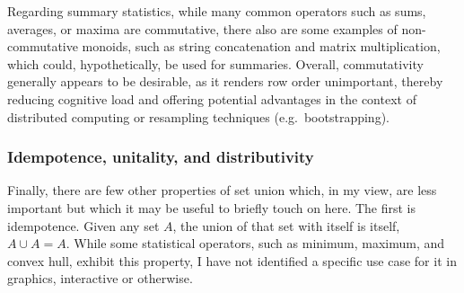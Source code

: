 \documentclass[
  openany]{book}
\theoremstyle{definition}
\theoremstyle{definition}
\theoremstyle{definition}
\theoremstyle{definition}
\theoremstyle{remark}
\begin{document}
Regarding summary statistics, while many common operators such as sums, averages, or maxima are commutative, there also are some examples of non-commutative monoids, such as string concatenation and matrix multiplication, which could, hypothetically, be used for summaries. Overall, commutativity generally appears to be desirable, as it renders row order unimportant, thereby reducing cognitive load and offering potential advantages in the context of distributed computing or resampling techniques (e.g.~bootstrapping).

\subsubsection{Idempotence, unitality, and distributivity}\label{idempotence-unitality-and-distributivity}

Finally, there are few other properties of set union which, in my view, are less important but which it may be useful to briefly touch on here. The first is idempotence. Given any set \(A\), the union of that set with itself is itself, \(A \cup A = A\). While some statistical operators, such as minimum, maximum, and convex hull, exhibit this property, I have not identified a specific use case for it in graphics, interactive or otherwise.
\end{document}

